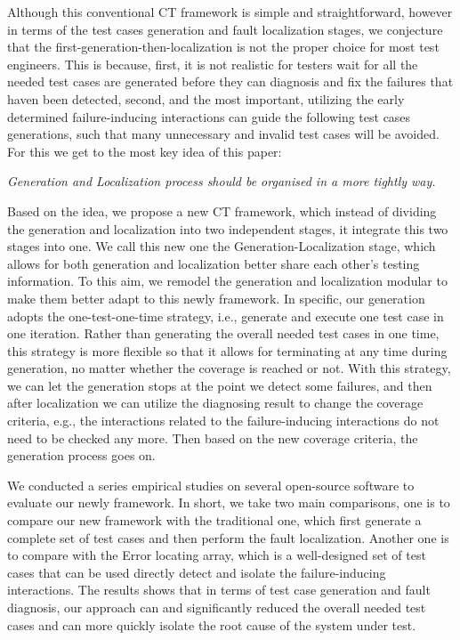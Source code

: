 \documentclass{sig-alternate}
\begin{document}
Although this conventional CT framework is simple and straightforward, however in terms of the test cases generation and fault localization stages, we conjecture that the first-generation-then-localization is not the proper choice for most test engineers. This is because, first, it is not realistic for testers wait for all the needed test cases are generated before they can diagnosis and fix the failures that haven been detected, second, and the most important, utilizing the early determined failure-inducing interactions can guide the following test cases generations, such that many unnecessary and invalid test cases will be avoided. For this we get to the most key idea of this paper:

\emph{Generation and Localization process should be organised in a more tightly way.}

Based on the idea, we propose a new CT framework, which instead of dividing the generation and localization into two independent stages, it integrate this two stages into one. We call this new one the Generation-Localization stage, which allows for both generation and localization better share each other's testing information. To this aim, we remodel the generation and localization modular to make them better adapt to this newly framework. In specific, our generation adopts the one-test-one-time strategy, i.e., generate and execute one test case in one iteration. Rather than generating the overall needed test cases in one time, this strategy is more flexible so that it allows for terminating at any time during generation, no matter whether the coverage is reached or not. With this strategy, we can let the generation stops at the point we detect some failures, and then after localization we can utilize the diagnosing result to change the coverage criteria, e.g., the interactions related to the failure-inducing interactions do not need to be checked any more. Then based on the new coverage criteria, the generation process goes on.


We conducted a series empirical studies on several open-source software to evaluate our newly framework. In short, we take two main comparisons, one is to compare our new framework with the traditional one, which first generate a complete set of test cases and then perform the fault localization. Another one is to compare with the Error locating array, which is a well-designed set of test cases that can be used directly detect and isolate the failure-inducing interactions. The results shows that in terms of test case generation and fault diagnosis, our approach can and significantly reduced the overall needed test cases and can more quickly isolate the root cause of the system under test.
\end{document}
